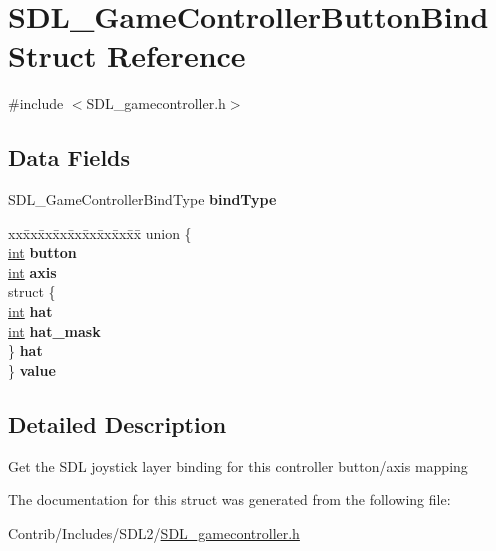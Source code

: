 \hypertarget{struct_s_d_l___game_controller_button_bind}{}\section{S\+D\+L\+\_\+\+Game\+Controller\+Button\+Bind Struct Reference}
\label{struct_s_d_l___game_controller_button_bind}


{\ttfamily \#include $<$S\+D\+L\+\_\+gamecontroller.\+h$>$}

\subsection*{Data Fields}
\begin{DoxyCompactItemize}
\item 
S\+D\+L\+\_\+\+Game\+Controller\+Bind\+Type {\bfseries bind\+Type}\hypertarget{struct_s_d_l___game_controller_button_bind_a3004ba500a61f95906163bf320a5a218}{}\label{struct_s_d_l___game_controller_button_bind_a3004ba500a61f95906163bf320a5a218}

\item 
\begin{tabbing}
xx\=xx\=xx\=xx\=xx\=xx\=xx\=xx\=xx\=\kill
union \{\\
\>\hyperlink{_s_d_l__thread_8h_a6a64f9be4433e4de6e2f2f548cf3c08e}{int} {\bfseries button}\\
\>\hyperlink{_s_d_l__thread_8h_a6a64f9be4433e4de6e2f2f548cf3c08e}{int} {\bfseries axis}\\
\>struct \{\\
\>\>\hyperlink{_s_d_l__thread_8h_a6a64f9be4433e4de6e2f2f548cf3c08e}{int} {\bfseries hat}\\
\>\>\hyperlink{_s_d_l__thread_8h_a6a64f9be4433e4de6e2f2f548cf3c08e}{int} {\bfseries hat\_mask}\\
\>\} {\bfseries hat}\\
\} {\bfseries value}\hypertarget{struct_s_d_l___game_controller_button_bind_af89130f2843e638f508a65d5225b0bd1}{}\label{struct_s_d_l___game_controller_button_bind_af89130f2843e638f508a65d5225b0bd1}
\\

\end{tabbing}\end{DoxyCompactItemize}


\subsection{Detailed Description}
Get the S\+DL joystick layer binding for this controller button/axis mapping 

The documentation for this struct was generated from the following file\+:\begin{DoxyCompactItemize}
\item 
Contrib/\+Includes/\+S\+D\+L2/\hyperlink{_s_d_l__gamecontroller_8h}{S\+D\+L\+\_\+gamecontroller.\+h}\end{DoxyCompactItemize}

